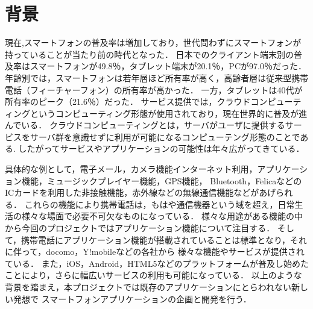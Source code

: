 \section{背景}
\par 
現在,スマートフォンの普及率は増加しており，世代問わずにスマートフォンが持っていることが当たり前の時代となった．
日本でのクライアント端末別の普及率はスマートフォンが49.8％，タブレット端末が20.1％，PCが97.0％だった．
年齢別では，スマートフォンは若年層ほど所有率が高く，高齢者層は従来型携帯電話（フィーチャーフォン）の所有率が高かった．
一方，タブレットは40代が所有率のピーク（21.6％）だった．
サービス提供では，クラウドコンピューティングというコンピューティング形態が使用されており，現在世界的に普及が進んでいる．
クラウドコンピューティングとは，サーバがユーザに提供するサービスをサーバ群を意識せずに利用が可能になるコンピューテング形態のことである.
したがってサービスやアプリケーションの可能性は年々広がってきている．
\par
具体的な例として，電子メール，カメラ機能インターネット利用，アプリケーション機能，ミュージックプレイヤー機能，GPS機能，
Bluetooth，FelicaなどのICカードを利用した非接触機能，赤外線などの無線通信機能などがあげられる．
これらの機能により携帯電話は，もはや通信機器という域を超え，日常生活の様々な場面で必要不可欠なものになっている．
様々な用途がある機能の中から今回のプロジェクトではアプリケーション機能について注目する．
そして，携帯電話にアプリケーション機能が搭載されていることは標準となり，それに伴って，docomo，Y!mobileなどの各社から
様々な機能やサービスが提供されている．
また，iOS，Android，HTML5などのプラットフォームが普及し始めたことにより，さらに幅広いサービスの利用も可能になっている．
以上のような背景を踏まえ，本プロジェクトでは既存のアプリケーションにとらわれない新しい発想で
スマートフォンアプリケーションの企画と開発を行う．
